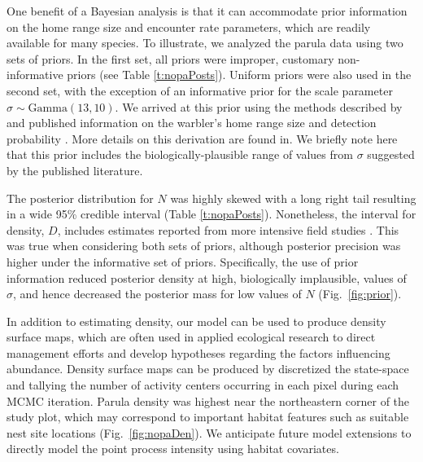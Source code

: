 One benefit of a Bayesian analysis is that it can accommodate prior
information on the home range size and encounter rate parameters,
which are readily available for many
species. To illustrate, we analyzed the parula data using two sets of
priors. In the first set, all priors were
improper, customary non-informative priors (see Table \ref{t:nopaPosts}).
Uniform priors were also used in the second set, with the exception of
an informative prior for the scale parameter $\sigma \sim
\mbox{Gamma}(13,10)$. We arrived at this prior using the methods
described by \citet{royle_etal:2011mee} and published
information on the warbler's home range size and detection probability
\citep{moldenhaer_regelski:1996,simons_etal:2009}. More details on this
derivation are found in. We briefly note here that this prior
includes the biologically-plausible range of values from $\sigma$
suggested by the published literature.

The posterior distribution for
$N$ was highly skewed with a long right tail resulting in a wide 95\%
credible interval (Table \ref{t:nopaPosts}). Nonetheless, the interval
for density, $D$, includes estimates reported from more intensive field
studies \citep[][]{moldenhaer_regelski:1996}. This was true when
considering
both sets of priors, although posterior precision was higher under the
informative set of priors. Specifically, the use of prior information
reduced posterior density at high, biologically implausible,
values of $\sigma$, and hence decreased the posterior mass for
low values of $N$ (Fig.~\ref{fig:prior}).

In addition to estimating density, our model can be used to produce
density surface maps, which are often used in applied ecological
research to direct management efforts and develop hypotheses regarding
the factors influencing abundance.
Density surface maps can be produced by discretized the
state-space and tallying the number of activity centers occurring in
each pixel during each MCMC iteration. Parula density was
highest near the northeastern corner of the study plot, which may
correspond to important habitat features such as suitable nest site
locations (Fig.~\ref{fig:nopaDen}). We anticipate future model
extensions to directly model the
point process intensity using habitat covariates.


